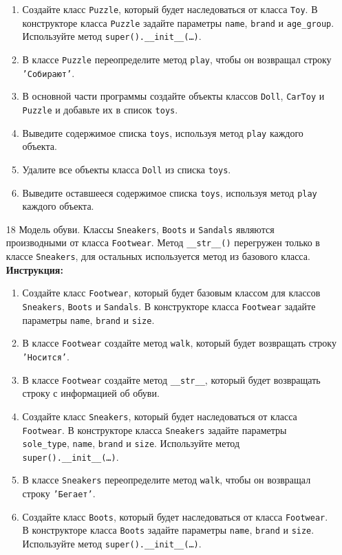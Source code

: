 \begin{enumerate}
\begin{enumerate}
    \item Создайте класс \texttt{Puzzle}, который будет наследоваться от класса \texttt{Toy}. В конструкторе класса \texttt{Puzzle} задайте параметры \texttt{name}, \texttt{brand} и \texttt{age\_group}. Используйте метод \texttt{super().\_\_init\_\_(\ldots)}.
    \item В классе \texttt{Puzzle} переопределите метод \texttt{play}, чтобы он возвращал строку \texttt{'Собирают'}.
    \item В основной части программы создайте объекты классов \texttt{Doll}, \texttt{CarToy} и \texttt{Puzzle} и добавьте их в список \texttt{toys}.
    \item Выведите содержимое списка \texttt{toys}, используя метод \texttt{play} каждого объекта.
    \item Удалите все объекты класса \texttt{Doll} из списка \texttt{toys}.
    \item Выведите оставшееся содержимое списка \texttt{toys}, используя метод \texttt{play} каждого объекта.
\end{enumerate}
\item[18]
Модель обуви. Классы \texttt{Sneakers}, \texttt{Boots} и \texttt{Sandals} являются производными от класса \texttt{Footwear}. Метод \texttt{\_\_str\_\_()} перегружен только в классе \texttt{Sneakers}, для остальных используется метод из базового класса.
\textbf{Инструкция:}
\begin{enumerate}
    \item Создайте класс \texttt{Footwear}, который будет базовым классом для классов \texttt{Sneakers}, \texttt{Boots} и \texttt{Sandals}. В конструкторе класса \texttt{Footwear} задайте параметры \texttt{name}, \texttt{brand} и \texttt{size}.
    \item В классе \texttt{Footwear} создайте метод \texttt{walk}, который будет возвращать строку \texttt{'Носится'}.
    \item В классе \texttt{Footwear} создайте метод \texttt{\_\_str\_\_}, который будет возвращать строку с информацией об обуви.
    \item Создайте класс \texttt{Sneakers}, который будет наследоваться от класса \texttt{Footwear}. В конструкторе класса \texttt{Sneakers} задайте параметры \texttt{sole\_type}, \texttt{name}, \texttt{brand} и \texttt{size}. Используйте метод \texttt{super().\_\_init\_\_(\ldots)}.
    \item В классе \texttt{Sneakers} переопределите метод \texttt{walk}, чтобы он возвращал строку \texttt{'Бегает'}.
    \item Создайте класс \texttt{Boots}, который будет наследоваться от класса \texttt{Footwear}. В конструкторе класса \texttt{Boots} задайте параметры \texttt{name}, \texttt{brand} и \texttt{size}. Используйте метод \texttt{super().\_\_init\_\_(\ldots)}.

\end{enumerate}
\end{enumerate}
